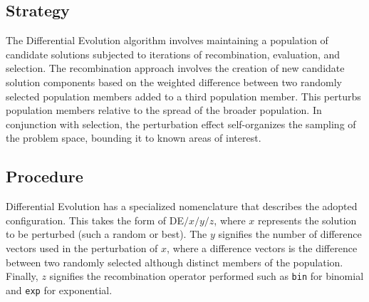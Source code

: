\subsection{Strategy}
The Differential Evolution algorithm involves maintaining a population of candidate solutions subjected to iterations of recombination, evaluation, and selection. The recombination approach involves the creation of new candidate solution components based on the weighted difference between two randomly selected population members added to a third population member. This perturbs population members relative to the spread of the broader population. In conjunction with selection, the perturbation effect self-organizes the sampling of the problem space, bounding it to known areas of interest.

\subsection{Procedure}
Differential Evolution has a specialized nomenclature that describes the adopted configuration. This takes the form of DE$/x/y/z$, where $x$ represents the solution to be perturbed (such a random or best). The $y$ signifies the number of difference vectors used in the perturbation of $x$, where a difference vectors is the difference between two randomly selected although distinct members of the population. Finally, $z$ signifies the recombination operator performed such as \texttt{bin} for binomial and \texttt{exp} for exponential. 

